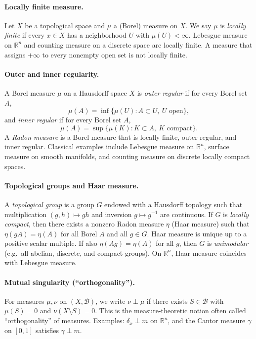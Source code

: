 \documentclass[12pt,a4paper]{article}
\theoremstyle{plain}
\theoremstyle{definition}
\theoremstyle{remark}
\theoremstyle{remark}
\theoremstyle{definition}
\begin{document}
	\paragraph{Locally finite measure.}
	Let $X$ be a topological space and $\mu$ a (Borel) measure on $X$.
	We say $\mu$ is \emph{locally finite} if every $x\in X$ has a neighborhood $U$
	with $\mu(U)<\infty$.
	Lebesgue measure on $\mathbb{R}^n$ and counting measure on a discrete space are locally finite.
	A measure that assigns $+\infty$ to every nonempty open set is not locally finite.
	
	\bigskip
	
	\paragraph{Outer and inner regularity.}
	A Borel measure $\mu$ on a Hausdorff space $X$ is
	\emph{outer regular} if for every Borel set $A$,
	\[
	\mu(A)=\inf\{\mu(U): A\subset U,\ U\text{ open}\},
	\]
	and \emph{inner regular} if for every Borel set $A$,
	\[
	\mu(A)=\sup\{\mu(K): K\subset A,\ K\text{ compact}\}.
	\]
	A \emph{Radon measure} is a Borel measure that is locally finite, outer regular, and inner regular.
	Classical examples include Lebesgue measure on $\mathbb{R}^n$, surface measure on smooth manifolds,
	and counting measure on discrete locally compact spaces.
	
	\bigskip
	
	\paragraph{Topological groups and Haar measure.}
	A \emph{topological group} is a group $G$ endowed with a Hausdorff topology such that
	multiplication $(g,h)\mapsto gh$ and inversion $g\mapsto g^{-1}$ are continuous.
	If $G$ is \emph{locally compact}, then there exists a nonzero Radon measure $\eta$
	(Haar measure) such that $\eta(gA)=\eta(A)$ for all Borel $A$ and all $g\in G$.
	Haar measure is unique up to a positive scalar multiple.
	If also $\eta(Ag)=\eta(A)$ for all $g$, then $G$ is \emph{unimodular}
	(e.g.\ all abelian, discrete, and compact groups).
	On $\mathbb{R}^n$, Haar measure coincides with Lebesgue measure.
	
	\bigskip
	
	\paragraph{Mutual singularity (``orthogonality'').}
	For measures $\mu,\nu$ on $(X,\mathcal{B})$, we write $\nu\perp\mu$ if there exists
	$S\in\mathcal{B}$ with $\mu(S)=0$ and $\nu(X\setminus S)=0$.
	This is the measure-theoretic notion often called ``orthogonality'' of measures.
	Examples: $\delta_x\perp m$ on $\mathbb{R}^n$, and the Cantor measure $\gamma$ on $[0,1]$ satisfies $\gamma\perp m$.
	
\end{document}
